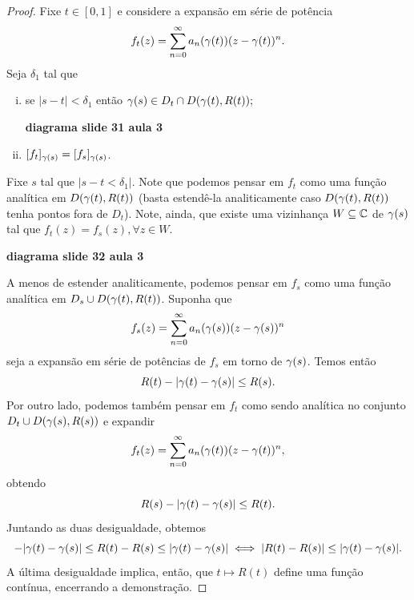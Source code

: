\begin{proof}
        Fixe $t\in [0,1]$ e considere a expansão em série de potência
        \begin{equation*}
            f_t(z) = \sum_{n=0}^{\infty} a_n(\gamma(t))(z-\gamma(t))^n.
        \end{equation*}
        Seja $\delta_1$ tal que 
        \begin{enumerate}[i)]
            \item se $|s-t|<\delta_1$ então $\gamma(s)\in D_t\cap D(\gamma(t), R(t));$
            \begin{center}
                \textbf{diagrama slide 31 aula 3}
            \end{center}
            \item $[f_t]_{\gamma(s)} = [f_s]_{\gamma(s)}$.
        \end{enumerate}
        Fixe $s$ tal que $|s-t<\delta_1|$. Note que podemos pensar em $f_t$ como uma 
        função analítica em $D(\gamma(t), R(t))$ (basta estendê-la analiticamente caso
        $D(\gamma(t), R(t))$ tenha pontos fora de $D_t$). Note, ainda, que existe uma 
        vizinhança $W\subseteq\mathbb{C}$ de $\gamma(s)$ tal que 
        $f_t(z) = f_s(z), \forall z\in W$.
        \begin{center}
            \textbf{diagrama slide 32 aula 3}
        \end{center}
        A menos de estender analiticamente, podemos pensar em $f_s$ como uma função analítica
        em $D_s\cup D(\gamma(t), R(t))$. Suponha que
        \begin{equation*}
            f_s(z) = \sum_{n=0}^\infty a_n(\gamma(s))(z-\gamma(s))^n
        \end{equation*}
        seja a expansão em série de potências de $f_s$ em torno de $\gamma(s)$. Temos então
        \begin{equation*}
            R(t) - |\gamma(t) - \gamma(s)| \leq R(s).
        \end{equation*}
        Por outro lado, podemos também pensar em $f_t$ como sendo analítica no conjunto
        $D_t\cup D(\gamma(s), R(s))$ e expandir
        \begin{equation*}
            f_t(z) = \sum_{n=0}^\infty a_n(\gamma(t))(z-\gamma(t))^n,
        \end{equation*}
        obtendo
        \begin{equation*}
            R(s) - |\gamma(t) - \gamma(s)| \leq R(t).
        \end{equation*}
        Juntando as duas desigualdade, obtemos
        \begin{equation*}
            -|\gamma(t) - \gamma(s)| \leq R(t) - R(s) \leq |\gamma(t) - \gamma(s)| 
            \iff
            |R(t) - R(s)| \leq |\gamma(t) - \gamma(s)|.
        \end{equation*}
        A última desigualdade implica, então, que $t\mapsto R(t)$ define uma função contínua,
        encerrando a demonstração.
    \end{proof}

